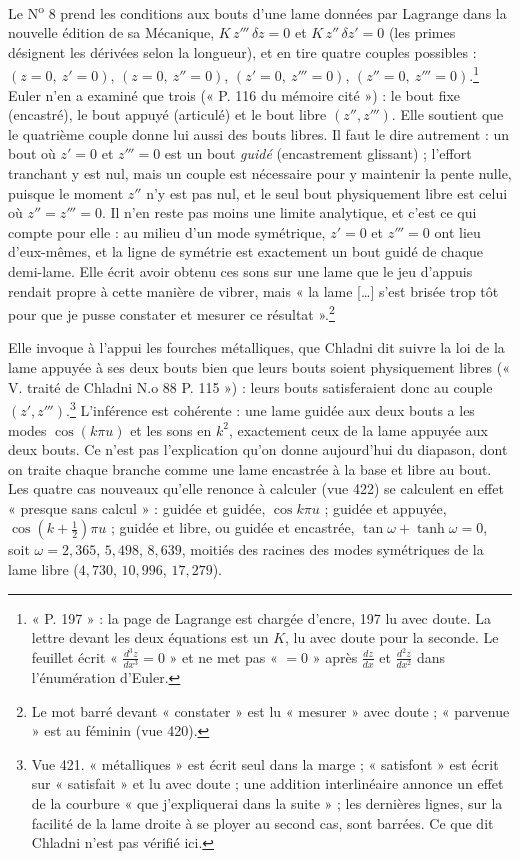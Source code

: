 \documentclass[11pt,a4paper]{article}
\begin{document}
Le N\textsuperscript{o} 8 prend les conditions aux bouts d'une lame données par
Lagrange dans la nouvelle édition de sa Mécanique, $K\,z'''\,\delta z = 0$ et
$K\,z''\,\delta z' = 0$ (les primes désignent les dérivées selon la longueur), et en
tire quatre couples possibles : $(z = 0,\ z' = 0)$, $(z = 0,\ z'' = 0)$,
$(z' = 0,\ z''' = 0)$, $(z'' = 0,\ z''' = 0)$.\footnote{« P. 197 » : la page de
Lagrange est chargée d'encre, 197 lu avec doute. La lettre devant les deux équations
est un $K$, lu avec doute pour la seconde. Le feuillet écrit « $\frac{d^3z}{dx^3} = 0$ »
et ne met pas « $= 0$ » après $\frac{dz}{dx}$ et $\frac{d^2z}{dx^2}$ dans l'énumération
d'Euler.} Euler n'en a examiné que trois (« P. 116 du mémoire cité ») : le bout fixe
(encastré), le bout appuyé (articulé) et le bout libre $(z'', z''')$. Elle soutient que
le quatrième couple donne lui aussi des bouts libres. Il faut le dire autrement : un
bout où $z' = 0$ et $z''' = 0$ est un bout \emph{guidé} (encastrement glissant) ;
l'effort tranchant y est nul, mais un couple est nécessaire pour y maintenir la pente
nulle, puisque le moment $z''$ n'y est pas nul, et le seul bout physiquement libre est
celui où $z'' = z''' = 0$. Il n'en reste pas moins une limite analytique, et c'est ce
qui compte pour elle : au milieu d'un mode symétrique, $z' = 0$ et $z''' = 0$ ont lieu
d'eux-mêmes, et la ligne de symétrie est exactement un bout guidé de chaque
demi-lame. Elle écrit avoir obtenu ces sons sur une lame que le jeu d'appuis rendait
propre à cette manière de vibrer, mais « la lame […] s'est brisée trop tôt pour que je
pusse constater et mesurer ce résultat ».\footnote{Le mot barré devant « constater »
est lu « mesurer » avec doute ; « parvenue » est au féminin (vue 420).}

Elle invoque à l'appui les fourches métalliques, que Chladni dit suivre la loi de la
lame appuyée à ses deux bouts bien que leurs bouts soient physiquement libres (« V.
traité de Chladni N.o 88 P. 115 ») : leurs bouts satisferaient donc au couple
$(z', z''')$.\footnote{Vue 421. « métalliques » est écrit seul dans la marge ;
« satisfont » est écrit sur « satisfait » et lu avec doute ; une addition interlinéaire
annonce un effet de la courbure « que j'expliquerai dans la suite » ; les dernières
lignes, sur la facilité de la lame droite à se ployer au second cas, sont barrées. Ce
que dit Chladni n'est pas vérifié ici.} L'inférence est cohérente : une lame guidée aux
deux bouts a les modes $\cos(k\pi u)$ et les sons en $k^2$, exactement ceux de la lame
appuyée aux deux bouts. Ce n'est pas l'explication qu'on donne aujourd'hui du
diapason, dont on traite chaque branche comme une lame encastrée à la base et libre au
bout. Les quatre cas nouveaux qu'elle renonce à calculer (vue 422) se calculent en
effet « presque sans calcul » : guidée et guidée, $\cos k\pi u$ ; guidée et appuyée,
$\cos(k+\frac12)\pi u$ ; guidée et libre, ou guidée et encastrée,
$\tan\omega + \tanh\omega = 0$, soit $\omega = 2{,}365$, $5{,}498$, $8{,}639$,
moitiés des racines des modes symétriques de la lame libre ($4{,}730$, $10{,}996$,
$17{,}279$).
\end{document}
